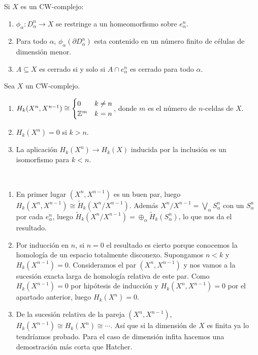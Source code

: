 \documentclass[TA.tex]{subfiles}
\begin{document}
\begin{prop}
Si $X$ es un CW-complejo:
\begin{enumerate}
\item $\phi_{\alpha}:D_{\alpha}^n\to X$ se restringe a un homeomorfismo sobre $e_{\alpha}^n$.
\item Para todo $\alpha$, $\phi_{\alpha}(\partial D_{\alpha}^n)$ esta contenido en un número finito de células de dimensión menor. 
\item $A\subseteq X$ es cerrado si y solo si $A\cap e_{\alpha}^n$ es cerrado para todo $\alpha$.
\end{enumerate}
\end{prop}

\begin{lemma}\label{lemacw}
Sea $X$ un CW-complejo.
\begin{enumerate}
\item $H_k(X^n,X^{n-1})\cong\begin{cases}
0 & k\neq n\\
\mathbb{Z}^m & k=n
\end{cases}$, donde $m$ es el número de $n$-celdas de $X$.
\item $H_k(X^n)=0$ si $k>n$. 
\item La aplicación $H_k(X^n)\to H_k(X)$ inducida por la inclusión es un isomorfismo para $k<n$.
\end{enumerate}
\begin{dem}\
\begin{enumerate}

\item
 En primer lugar $(X^n,X^{n-1})$ es un buen par, luego $H_k(X^n,X^{n-1})\cong \widetilde{H}_k(X^n/X^{n-1})$. Además $X^n/X^{n-1}=\bigvee_{\alpha} S^n_{\alpha}$ con un $S^n_{\alpha}$ por cada $e^n_{\alpha}$, luego $\widetilde{H}_k(X^n/X^{n-1})=\oplus_{\alpha}\widetilde{H}_k(S^n_{\alpha})$, lo que nos da el resultado.
 \item Por inducción en $n$, si $n=0$ el resultado es cierto porque conocemos la homología de un espacio totalmente disconexo. Supongamos $n<k$ y $H_k(X^{n-1})=0$. Consideramos el par $(X^n,X^{n-1})$ y nos vamos a la sucesión exacta larga de homología relativa de este par. Como $H_k(X^{n-1})=0$ por hipótesis de inducción y $H_k(X^n,X^{n-1})=0$ por el apartado anterior, luego $H_k(X^n)=0$.
 
 \item De la sucesión relativa de la pareja $(X^n,X^{n-1})$, $H_k(X^{n-1})\cong H_k(X^n)\cong\cdots$. Así que si la dimensión de $X$ es finita ya lo tendríamos probado. Para el caso de dimensión infita hacemos una demostración más corta que Hatcher.
 

\end{enumerate}
\end{dem}
\end{lemma}
\end{document}
